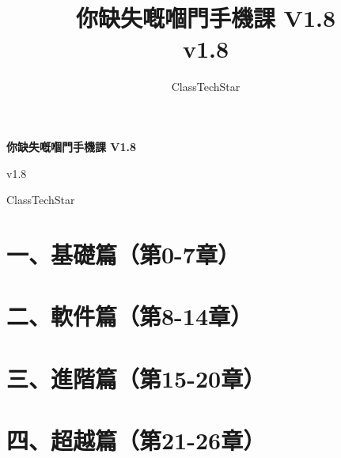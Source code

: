 \documentclass[11pt,a4paper,openany]{book}
\title{你缺失嘅嗰門手機課 V1.8\\ \large v1.8}
\author{ClassTechStar}
\date{}
\begin{document}
\begin{titlepage}
\centering
\vspace*{0.28\textheight}
{\Huge\bfseries 你缺失嘅嗰門手機課 V1.8\par}
\vspace{1.2em}
{\Large v1.8\par}
\vfill
{\large ClassTechStar\par}
\end{titlepage}
\frontmatter
\tableofcontents
\mainmatter
\part*{一、基礎篇（第0-7章）}










\part*{二、軟件篇（第8-14章）}








\part*{三、進階篇（第15-20章）}







\part*{四、超越篇（第21-26章）}







\end{document}
